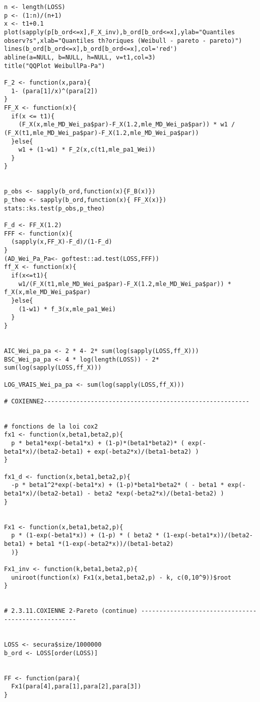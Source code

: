 \begin{verbatim}
n <- length(LOSS)
p <- (1:n)/(n+1)
x <- t1+0.1
plot(sapply(p[b_ord<=x],F_X_inv),b_ord[b_ord<=x],ylab="Quantiles observ?s",xlab="Quantiles th?oriques (Weibull - pareto - pareto)")
lines(b_ord[b_ord<=x],b_ord[b_ord<=x],col='red')
abline(a=NULL, b=NULL, h=NULL, v=t1,col=3)
title("QQPlot WeibullPa-Pa")

F_2 <- function(x,para){
  1- (para[1]/x)^(para[2])
}
FF_X <- function(x){
  if(x <= t1){
    (F_X(x,mle_MD_Wei_pa$par)-F_X(1.2,mle_MD_Wei_pa$par)) * w1 / (F_X(t1,mle_MD_Wei_pa$par)-F_X(1.2,mle_MD_Wei_pa$par)) 
  }else{
    w1 + (1-w1) * F_2(x,c(t1,mle_pa1_Wei))
  }
}


p_obs <- sapply(b_ord,function(x){F_B(x)})
p_theo <- sapply(b_ord,function(x){ FF_X(x)})
stats::ks.test(p_obs,p_theo)

F_d <- FF_X(1.2)
FFF <- function(x){
  (sapply(x,FF_X)-F_d)/(1-F_d)
}
(AD_Wei_Pa_Pa<- goftest::ad.test(LOSS,FFF))
ff_X <- function(x){
  if(x<=t1){
    w1/(F_X(t1,mle_MD_Wei_pa$par)-F_X(1.2,mle_MD_Wei_pa$par)) * f_X(x,mle_MD_Wei_pa$par)
  }else{
    (1-w1) * f_3(x,mle_pa1_Wei)
  } 
}


AIC_Wei_pa_pa <- 2 * 4- 2* sum(log(sapply(LOSS,ff_X)))
BSC_Wei_pa_pa <- 4 * log(length(LOSS)) - 2* sum(log(sapply(LOSS,ff_X)))

LOG_VRAIS_Wei_pa_pa <- sum(log(sapply(LOSS,ff_X)))

# COXIENNE2---------------------------------------------------------


# fonctions de la loi cox2
fx1 <- function(x,beta1,beta2,p){
  p * beta1*exp(-beta1*x) + (1-p)*(beta1*beta2)* ( exp(-beta1*x)/(beta2-beta1) + exp(-beta2*x)/(beta1-beta2) )
}

fx1_d <- function(x,beta1,beta2,p){
  -p * beta1^2*exp(-beta1*x) + (1-p)*beta1*beta2* ( - beta1 * exp(-beta1*x)/(beta2-beta1) - beta2 *exp(-beta2*x)/(beta1-beta2) )
}


Fx1 <- function(x,beta1,beta2,p){
  p * (1-exp(-beta1*x)) + (1-p) * ( beta2 * (1-exp(-beta1*x))/(beta2-beta1) + beta1 *(1-exp(-beta2*x))/(beta1-beta2)
  )}

Fx1_inv <- function(k,beta1,beta2,p){ 
  uniroot(function(x) Fx1(x,beta1,beta2,p) - k, c(0,10^9))$root
}


# 2.3.11.COXIENNE 2-Pareto (continue) ----------------------------------------------------


LOSS <- secura$size/1000000
b_ord <- LOSS[order(LOSS)]


FF <- function(para){
  Fx1(para[4],para[1],para[2],para[3])
}



\end{verbatim}
